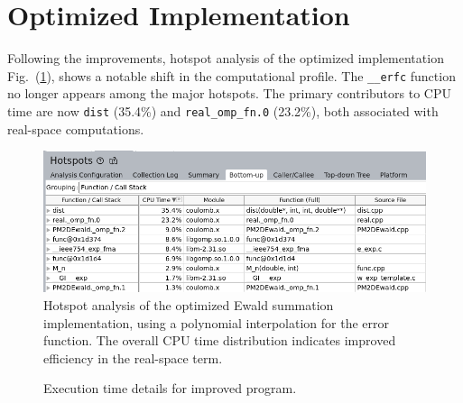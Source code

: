 \section{Optimized Implementation}
Following the improvements, hotspot analysis of the optimized implementation Fig.~(\ref{fig:resultVTuneFinal}), shows a notable shift in the computational profile. The \texttt{\_\_erfc} function no longer appears among the major hotspots. The primary contributors to CPU time are now \texttt{dist} (35.4\%) and \texttt{real\_omp\_fn.0} (23.2\%), both associated with real-space computations. 
\begin{figure}[htbp]
    \centering
    \includegraphics[width = \linewidth]{images/VTuneFinalHotSpots.png}
    \caption{Hotspot analysis of the optimized Ewald summation implementation, using a polynomial interpolation for the error function. The overall CPU time distribution indicates improved efficiency in the real-space term.}
    \label{fig:resultVTuneFinal}
\end{figure}
\begin{figure}[htbp]
    \centering
    \begin{minipage}{0.7\textwidth}
    \end{minipage}%
    \begin{minipage}{0.3\textwidth}
        \caption{Execution time details for improved program.}
    \end{minipage}
\end{figure}

